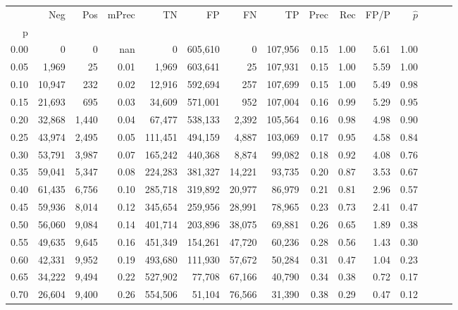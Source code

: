 \begin{tabular}{rrrrrrrrrrrrrrr}
\toprule
{} &     Neg &    Pos & mPrec &       TN &       FP &       FN &       TP &  Prec &   Rec &  FP/P & $\hat{p}$ \\
p    &         &        &       &          &          &          &          &       &       &       &           \\
\midrule
0.00 &       0 &      0 &   nan &        0 &  605,610 &        0 &  107,956 &  0.15 &  1.00 &  5.61 &      1.00 \\
0.05 &   1,969 &     25 &  0.01 &    1,969 &  603,641 &       25 &  107,931 &  0.15 &  1.00 &  5.59 &      1.00 \\
0.10 &  10,947 &    232 &  0.02 &   12,916 &  592,694 &      257 &  107,699 &  0.15 &  1.00 &  5.49 &      0.98 \\
0.15 &  21,693 &    695 &  0.03 &   34,609 &  571,001 &      952 &  107,004 &  0.16 &  0.99 &  5.29 &      0.95 \\
0.20 &  32,868 &  1,440 &  0.04 &   67,477 &  538,133 &    2,392 &  105,564 &  0.16 &  0.98 &  4.98 &      0.90 \\
0.25 &  43,974 &  2,495 &  0.05 &  111,451 &  494,159 &    4,887 &  103,069 &  0.17 &  0.95 &  4.58 &      0.84 \\
0.30 &  53,791 &  3,987 &  0.07 &  165,242 &  440,368 &    8,874 &   99,082 &  0.18 &  0.92 &  4.08 &      0.76 \\
0.35 &  59,041 &  5,347 &  0.08 &  224,283 &  381,327 &   14,221 &   93,735 &  0.20 &  0.87 &  3.53 &      0.67 \\
0.40 &  61,435 &  6,756 &  0.10 &  285,718 &  319,892 &   20,977 &   86,979 &  0.21 &  0.81 &  2.96 &      0.57 \\
0.45 &  59,936 &  8,014 &  0.12 &  345,654 &  259,956 &   28,991 &   78,965 &  0.23 &  0.73 &  2.41 &      0.47 \\
0.50 &  56,060 &  9,084 &  0.14 &  401,714 &  203,896 &   38,075 &   69,881 &  0.26 &  0.65 &  1.89 &      0.38 \\
0.55 &  49,635 &  9,645 &  0.16 &  451,349 &  154,261 &   47,720 &   60,236 &  0.28 &  0.56 &  1.43 &      0.30 \\
0.60 &  42,331 &  9,952 &  0.19 &  493,680 &  111,930 &   57,672 &   50,284 &  0.31 &  0.47 &  1.04 &      0.23 \\
0.65 &  34,222 &  9,494 &  0.22 &  527,902 &   77,708 &   67,166 &   40,790 &  0.34 &  0.38 &  0.72 &      0.17 \\
0.70 &  26,604 &  9,400 &  0.26 &  554,506 &   51,104 &   76,566 &   31,390 &  0.38 &  0.29 &  0.47 &      0.12 \\

\end{tabular}
